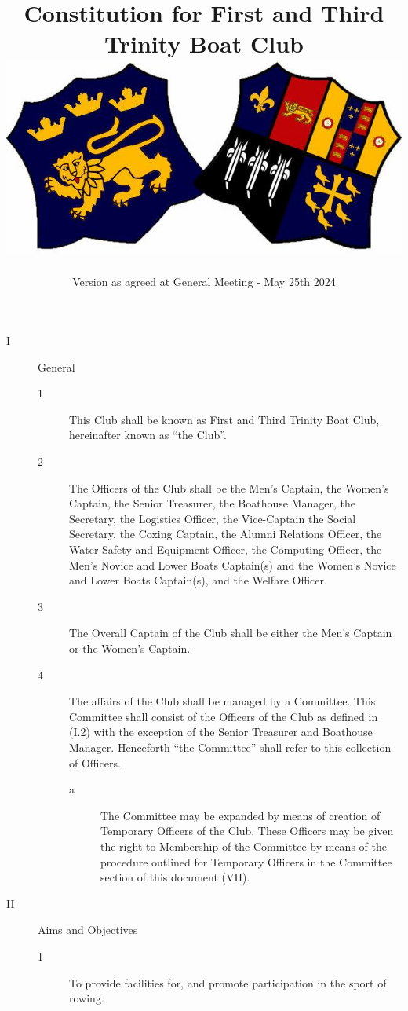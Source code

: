 \documentclass{article}
\title{{Constitution for First and Third Trinity Boat Club}\\ {\includegraphics{crest.jpeg}}}
\date{Version as agreed at General Meeting - May 25th 2024}
\begin{document}
\maketitle

\begin{description}
	\item[I] General
	\begin{description}
		\item[1] This Club shall be known as First and Third Trinity Boat Club, hereinafter
		known as “the Club”.\\
		
		\item[2] The Officers of the Club shall be the Men's Captain, the Women’s Captain, the
		Senior Treasurer, the Boathouse Manager, the Secretary, the Logistics Officer,
		the Vice-Captain the Social Secretary, the Coxing Captain, the Alumni
		Relations Officer, the Water Safety and Equipment Officer, the Computing
		Officer, the Men's Novice and Lower Boats Captain(s) and the Women’s
		Novice and Lower Boats Captain(s), and the Welfare Officer.\\
		
		\item[3] The Overall Captain of the Club shall be either the Men's Captain or the
		Women's Captain. \\
		
		\item[4] The affairs of the Club shall be managed by a Committee. This Committee
		shall consist of the Officers of the Club as defined in (I.2) with the exception
		of the Senior Treasurer and Boathouse Manager. Henceforth “the Committee”
		shall refer to this collection of Officers.
		
		\begin{description}
			\item[a] The Committee may be expanded by means of creation of Temporary
			Officers of the Club. These Officers may be given the right to
			Membership of the Committee by means of the procedure outlined for
			Temporary Officers in the Committee section of this document (VII).
		\end{description}
	\end{description}

	\item[II] Aims and Objectives
	\begin{description}
		\item[1] To provide facilities for, and promote participation in the sport of rowing.\\
		

\end{description}
\end{description}
\end{document}
